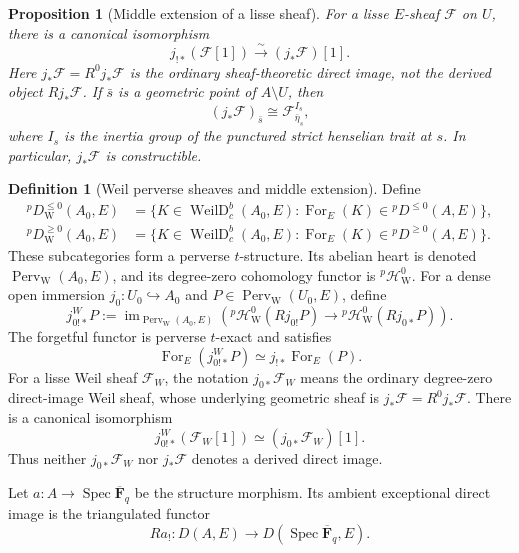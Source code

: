 \documentclass[10pt]{article}
\newtheorem{proposition}[theorem]{Proposition}
\theoremstyle{definition}
\newtheorem{definition}[theorem]{Definition}
\newcommand{\Fbar}{\overline{\mathbf F}_q}
\newcommand{\Spec}{\operatorname{Spec}}
\begin{document}
\begin{proposition}[Middle extension of a lisse sheaf]
For a lisse \(E\)-sheaf \(\mathcal F\) on \(U\), there is a canonical
isomorphism
\[
  j_{!*}(\mathcal F[1])\xrightarrow{\sim}(j_*\mathcal F)[1].
\]
Here \(j_*\mathcal F=R^0j_*\mathcal F\) is the ordinary sheaf-theoretic
direct image, not the derived object \(Rj_*\mathcal F\).  If
\(\bar s\) is a geometric point of \(A\setminus U\), then
\[
  (j_*\mathcal F)_{\bar s}
  \cong \mathcal F_{\bar\eta_s}^{I_s},
\]
where \(I_s\) is the inertia group of the punctured strict henselian trait at
\(s\).  In particular, \(j_*\mathcal F\) is constructible.
\end{proposition}

\begin{definition}[Weil perverse sheaves and middle extension]
Define
\[
 \begin{aligned}
 {}^pD_{\mathrm W}^{\leq0}(A_0,E)
  &=\{K\in\operatorname{WeilD}^b_c(A_0,E):
        \operatorname{For}_E(K)\in{}^pD^{\leq0}(A,E)\},\\
 {}^pD_{\mathrm W}^{\geq0}(A_0,E)
  &=\{K\in\operatorname{WeilD}^b_c(A_0,E):
        \operatorname{For}_E(K)\in{}^pD^{\geq0}(A,E)\}.
 \end{aligned}
\]
These subcategories form a perverse \(t\)-structure.  Its abelian heart is
denoted \(\operatorname{Perv}_{\mathrm W}(A_0,E)\), and its degree-zero
cohomology functor is \({}^p\mathcal H^0_{\mathrm W}\).  For a dense open
immersion \(j_0:U_0\hookrightarrow A_0\) and
\(P\in\operatorname{Perv}_{\mathrm W}(U_0,E)\), define
\[
 j^W_{0!*}P:=\operatorname{im}_{\operatorname{Perv}_{\mathrm W}(A_0,E)}
 \left({}^p\mathcal H^0_{\mathrm W}(Rj_{0!}P)
       \longrightarrow{}^p\mathcal H^0_{\mathrm W}(Rj_{0*}P)\right).
\]
The forgetful functor is perverse \(t\)-exact and satisfies
\[
 \operatorname{For}_E(j^W_{0!*}P)
       \simeq j_{!*}\operatorname{For}_E(P).
\]
For a lisse Weil sheaf \(\mathcal F_W\), the notation
\(j_{0*}\mathcal F_W\) means the ordinary degree-zero direct-image Weil
sheaf, whose underlying geometric sheaf is
\(j_*\mathcal F=R^0j_*\mathcal F\).  There is a canonical isomorphism
\[
 j^W_{0!*}(\mathcal F_W[1])\simeq(j_{0*}\mathcal F_W)[1].
\]
Thus neither \(j_{0*}\mathcal F_W\) nor \(j_*\mathcal F\) denotes a
derived direct image.
\end{definition}

Let \(a:A\to\Spec\Fbar\) be the structure morphism.  Its ambient exceptional
direct image is the triangulated functor
\[
  Ra_!:D(A,E)\longrightarrow D(\Spec\Fbar,E).
\]
\end{document}
